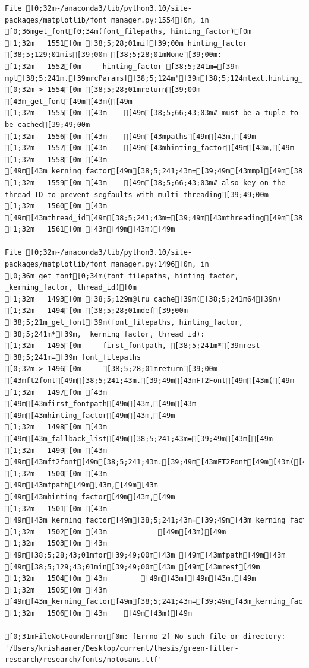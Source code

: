\documentclass[
  letterpaper,
  DIV=11,
  numbers=noendperiod]{scrartcl}
\begin{document}
\begin{verbatim}
File [0;32m~/anaconda3/lib/python3.10/site-packages/matplotlib/font_manager.py:1554[0m, in [0;36mget_font[0;34m(font_filepaths, hinting_factor)[0m
[1;32m   1551[0m [38;5;28;01mif[39;00m hinting_factor [38;5;129;01mis[39;00m [38;5;28;01mNone[39;00m:
[1;32m   1552[0m     hinting_factor [38;5;241m=[39m mpl[38;5;241m.[39mrcParams[[38;5;124m'[39m[38;5;124mtext.hinting_factor[39m[38;5;124m'[39m]
[0;32m-> 1554[0m [38;5;28;01mreturn[39;00m [43m_get_font[49m[43m([49m
[1;32m   1555[0m [43m    [49m[38;5;66;43;03m# must be a tuple to be cached[39;49;00m
[1;32m   1556[0m [43m    [49m[43mpaths[49m[43m,[49m
[1;32m   1557[0m [43m    [49m[43mhinting_factor[49m[43m,[49m
[1;32m   1558[0m [43m    [49m[43m_kerning_factor[49m[38;5;241;43m=[39;49m[43mmpl[49m[38;5;241;43m.[39;49m[43mrcParams[49m[43m[[49m[38;5;124;43m'[39;49m[38;5;124;43mtext.kerning_factor[39;49m[38;5;124;43m'[39;49m[43m][49m[43m,[49m
[1;32m   1559[0m [43m    [49m[38;5;66;43;03m# also key on the thread ID to prevent segfaults with multi-threading[39;49;00m
[1;32m   1560[0m [43m    [49m[43mthread_id[49m[38;5;241;43m=[39;49m[43mthreading[49m[38;5;241;43m.[39;49m[43mget_ident[49m[43m([49m[43m)[49m
[1;32m   1561[0m [43m[49m[43m)[49m

File [0;32m~/anaconda3/lib/python3.10/site-packages/matplotlib/font_manager.py:1496[0m, in [0;36m_get_font[0;34m(font_filepaths, hinting_factor, _kerning_factor, thread_id)[0m
[1;32m   1493[0m [38;5;129m@lru_cache[39m([38;5;241m64[39m)
[1;32m   1494[0m [38;5;28;01mdef[39;00m [38;5;21m_get_font[39m(font_filepaths, hinting_factor, [38;5;241m*[39m, _kerning_factor, thread_id):
[1;32m   1495[0m     first_fontpath, [38;5;241m*[39mrest [38;5;241m=[39m font_filepaths
[0;32m-> 1496[0m     [38;5;28;01mreturn[39;00m [43mft2font[49m[38;5;241;43m.[39;49m[43mFT2Font[49m[43m([49m
[1;32m   1497[0m [43m        [49m[43mfirst_fontpath[49m[43m,[49m[43m [49m[43mhinting_factor[49m[43m,[49m
[1;32m   1498[0m [43m        [49m[43m_fallback_list[49m[38;5;241;43m=[39;49m[43m[[49m
[1;32m   1499[0m [43m            [49m[43mft2font[49m[38;5;241;43m.[39;49m[43mFT2Font[49m[43m([49m
[1;32m   1500[0m [43m                [49m[43mfpath[49m[43m,[49m[43m [49m[43mhinting_factor[49m[43m,[49m
[1;32m   1501[0m [43m                [49m[43m_kerning_factor[49m[38;5;241;43m=[39;49m[43m_kerning_factor[49m
[1;32m   1502[0m [43m            [49m[43m)[49m
[1;32m   1503[0m [43m            [49m[38;5;28;43;01mfor[39;49;00m[43m [49m[43mfpath[49m[43m [49m[38;5;129;43;01min[39;49;00m[43m [49m[43mrest[49m
[1;32m   1504[0m [43m        [49m[43m][49m[43m,[49m
[1;32m   1505[0m [43m        [49m[43m_kerning_factor[49m[38;5;241;43m=[39;49m[43m_kerning_factor[49m
[1;32m   1506[0m [43m    [49m[43m)[49m

[0;31mFileNotFoundError[0m: [Errno 2] No such file or directory: '/Users/krishaamer/Desktop/current/thesis/green-filter-research/research/fonts/notosans.ttf'
\end{verbatim}
\end{document}
